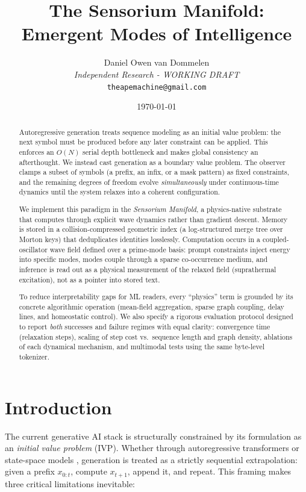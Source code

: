 \documentclass[11pt,a4paper]{article}
\title{%
  \textbf{The Sensorium Manifold}: \\[0.3em]
  \large Emergent Modes of Intelligence
}
\author{
  Daniel Owen van Dommelen\\
  \textit{Independent Research - WORKING DRAFT}\\
  \texttt{theapemachine@gmail.com}
}
\date{\today}
\begin{document}
\begin{abstract}
Autoregressive generation treats sequence modeling as an initial value problem: the next symbol must be produced before any later constraint can be applied. This enforces an $O(N)$ serial depth bottleneck and makes global consistency an afterthought. We instead cast generation as a boundary value problem. The observer clamps a subset of symbols (a prefix, an infix, or a mask pattern) as fixed constraints, and the remaining degrees of freedom evolve \emph{simultaneously} under continuous-time dynamics until the system relaxes into a coherent configuration.

We implement this paradigm in the \emph{Sensorium Manifold}, a physics-native substrate that computes through explicit wave dynamics rather than gradient descent. Memory is stored in a collision-compressed geometric index (a log-structured merge tree over Morton keys) that deduplicates identities losslessly. Computation occurs in a coupled-oscillator wave field defined over a prime-mode basis: prompt constraints inject energy into specific modes, modes couple through a sparse co-occurrence medium, and inference is read out as a physical measurement of the relaxed field (suprathermal excitation), not as a pointer into stored text.

To reduce interpretability gaps for ML readers, every ``physics'' term is grounded by its concrete algorithmic operation (mean-field aggregation, sparse graph coupling, delay lines, and homeostatic control). We also specify a rigorous evaluation protocol designed to report \emph{both} successes and failure regimes with equal clarity: convergence time (relaxation steps), scaling of step cost vs.\ sequence length and graph density, ablations of each dynamical mechanism, and multimodal tests using the same byte-level tokenizer.
\end{abstract}




\section{Introduction}
\label{sec:introduction}

The current generative AI stack is structurally constrained by its formulation as an \emph{initial value problem} (IVP). Whether through autoregressive transformers \citep{vaswani2017attention} or state-space models \citep{gu2022efficiently}, generation is treated as a strictly sequential extrapolation: given a prefix $x_{0:t}$, compute $x_{t+1}$, append it, and repeat. This framing makes three critical limitations inevitable:
\end{document}
